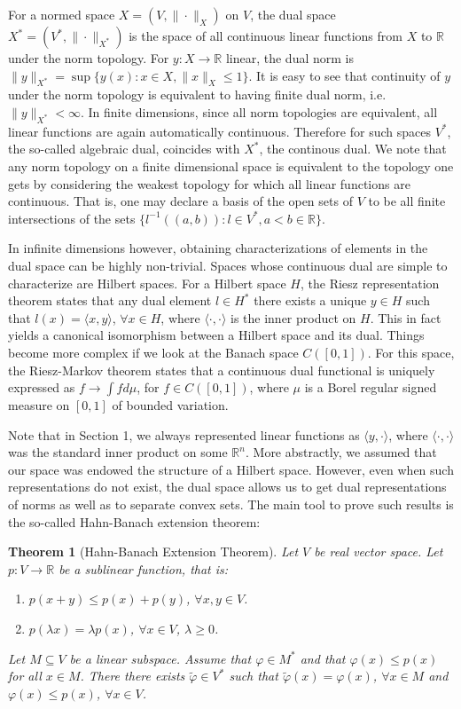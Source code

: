 \documentclass[11pt]{article}
\newtheorem{theorem}{Theorem}
\theoremstyle{plain}
\theoremstyle{plain}
\newcommand{\set}[1]{\{{#1}\}}
\newcommand{\R}{\ensuremath{\mathbb{R}}}
\newcommand{\pr}[2]{\langle{#1, #2}\rangle}
\begin{document}
For a normed space $X = (V,\|\cdot\|_X)$ on $V$, the dual space
$X^*=(V^*,\|\cdot\|_{X^*})$ is the space of all continuous linear functions from
$X$ to $\R$ under the norm topology. For $y: X \rightarrow \R$ linear, the dual
norm is $\|y\|_{X^*} = \sup \set{y(x): x \in X, \|x\|_X \leq 1}$. It is easy to
see that continuity of $y$ under the norm topology is equivalent to having
finite dual norm, i.e.~$\|y\|_{X^*} < \infty$. In finite dimensions, since all
norm topologies are equivalent, all linear functions are again automatically
continuous. Therefore for such spaces $V^*$, the so-called algebraic dual,
coincides with $X^*$, the continous dual. We note that any norm topology on a
finite dimensional space is equivalent to the topology one gets by considering
the weakest topology for which all linear functions are continuous. That is, one
may declare a basis of the open sets of $V$ to be all finite intersections of
the sets $\set{l^{-1}((a,b)): l \in V^*, a < b \in \R}$. 

In infinite dimensions however, obtaining characterizations of elements in the
dual space can be highly non-trivial. Spaces whose continuous dual are simple to
characterize are Hilbert spaces. For a Hilbert space $H$, the Riesz
representation theorem states that any dual element $l \in H^*$ there exists a
unique $y \in H$ such that $l(x) = \pr{x}{y}$, $\forall x \in H$, where
$\pr{\cdot}{\cdot}$ is the inner product on $H$. This in fact yields a canonical
isomorphism between a Hilbert space and its dual. Things become more complex
if we look at the Banach space $C([0,1])$. For this space, the Riesz-Markov
theorem states that a continuous dual functional is uniquely expressed as $f
\rightarrow \int f d\mu$, for $f \in C([0,1])$, where $\mu$ is a Borel regular
signed measure on $[0,1]$ of bounded variation. 

Note that in Section 1, we always represented linear functions as
$\pr{y}{\cdot}$, where $\pr{\cdot}{\cdot}$ was the standard inner product on
some $\R^n$. More abstractly, we assumed that our space was endowed the
structure of a Hilbert space. However, even when such representations do not exist,
the dual space allows us to get dual representations of norms as well as to
separate convex sets. The main tool to prove such results is the so-called
Hahn-Banach extension theorem:

\begin{theorem}[Hahn-Banach Extension Theorem] 
Let $V$ be real vector space. Let $p: V \rightarrow \R$ be a sublinear function,
that is:
\begin{enumerate}
\item $p(x+y) \leq p(x)+p(y)$, $\forall x,y \in V$.
\item $p(\lambda x) = \lambda p(x)$, $\forall x \in V$, $\lambda \geq 0$.
\end{enumerate}
Let $M \subseteq V$ be a linear subspace. Assume that $\varphi \in M^*$ and that
$\varphi(x) \leq p(x)$ for all $x \in M$. There there exists $\tilde{\varphi}
\in V^*$ such that $\tilde{\varphi}(x) = \varphi(x)$, $\forall x \in M$ and
$\varphi(x) \leq p(x)$, $\forall x \in V$.
\label{thm:hb-ext}
\end{theorem} 
\end{document}
